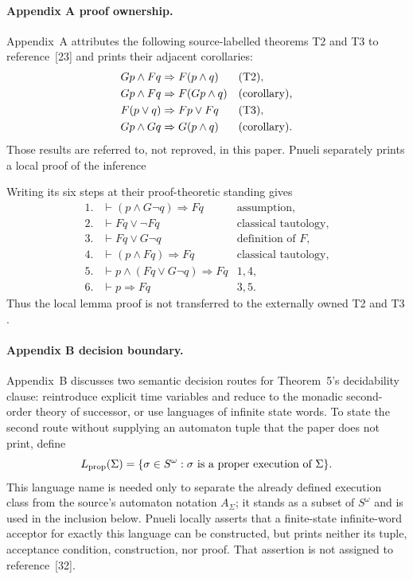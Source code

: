 \paragraph{Appendix A proof ownership.}
Appendix~A attributes the following source-labelled theorems T2 and T3 to
reference~[23] and prints their adjacent corollaries:
\[
\begin{aligned}
 Gp\land Fq&\Rightarrow F(p\land q) &&({\rm T2}),\\
 Gp\land Fq&\Rightarrow F(Gp\land q) &&({\rm corollary}),\\
 F(p\lor q)&\Rightarrow Fp\lor Fq &&({\rm T3}),\\
 Gp\land Gq&\Rightarrow G(p\land q) &&({\rm corollary}).
\end{aligned}
\]
Those results are referred to, not reproved, in this paper.  Pnueli separately
prints a local proof of the inference
\par\noindent
\begin{minipage}{\linewidth}
\end{minipage}
\par
Writing its six steps at their proof-theoretic standing gives
\[
\begin{array}{rll}
1.&\vdash(p\land G\neg q)\Rightarrow Fq&\text{assumption},\\
2.&\vdash Fq\lor\neg Fq&\text{classical tautology},\\
3.&\vdash Fq\lor G\neg q&\text{definition of }F,\\
4.&\vdash(p\land Fq)\Rightarrow Fq&\text{classical tautology},\\
5.&\vdash p\land(Fq\lor G\neg q)\Rightarrow Fq&1,4,\\
6.&\vdash p\Rightarrow Fq&3,5.
\end{array}
\]
Thus the local lemma proof is not transferred to the externally owned T2 and
T3 \cite[p.~57]{Pnueli1977}.

\paragraph{Appendix B decision boundary.}
Appendix~B discusses two semantic decision routes for Theorem~5's decidability
clause: reintroduce explicit time variables and reduce to the monadic
second-order theory of successor, or use languages of infinite state words.
To state the second route without
supplying an automaton tuple that the paper does not print, define
\[
 L_{\rm prop}(\Sigma)
 =\{\sigma\in S^\omega:\sigma\text{ is a proper execution of }\Sigma\}.
\]
This language name is needed only to separate the already defined execution
class from the source's automaton notation \(A_\Sigma\); it stands as a
subset of \(S^\omega\) and is used in the inclusion below.  Pnueli locally
asserts that a finite-state infinite-word acceptor for exactly this language
can be constructed, but prints neither its tuple, acceptance condition,
construction, nor proof.  That assertion is not assigned to reference~[32].

